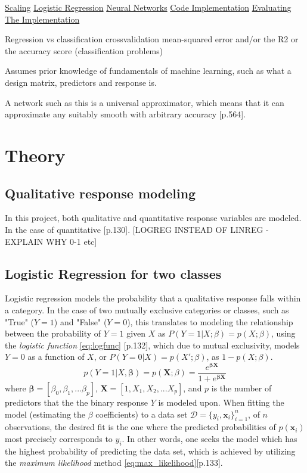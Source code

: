 \documentclass[%
oneside,                 %
final,                   %
10pt]{article}
\begin{document}
\hyperref[Section_M_Scaling]{Scaling}
\hyperref[Section_M_Logreg]{Logistic Regression}
\hyperref[Section_M_NN]{Neural Networks}
\hyperref[Section_M_Codeimpl]{Code Implementation}
\hyperref[Section_M_eval]{Evaluating The Implementation}

Regression vs classification
crossvalidation
mean-squared error and/or the R2
or the accuracy score (classification problems) 

Assumes prior knowledge of fundamentals of machine learning, such as what a design matrix, predictors and response is.

A network such as this is a universal approximator, which means that it can approximate any suitably smooth with arbitrary accuracy \citep{MLMurphy}[p.564].
\section{Theory} \label{Section_Theory}

\subsection{Qualitative response modeling}
In this project, both qualitative and quantitative response variables are modeled.  In the case of quantitative \citep{2017introstatlearn}[p.130]. [LOGREG INSTEAD OF LINREG  -EXPLAIN WHY 0-1 etc]


\subsection{Logistic Regression for two classes} \label{Section_M_Logreg}
Logistic regression models the probability that a qualitative response falls within a category. In the case of two mutually exclusive categories or classes, such as "True" ($Y=1$) and "False" ($Y=0$), this translates to modeling the relationship between the probability of $Y=1$ given $X$ as $P(Y=1|X;\beta)=p(X;\beta)$, using the \textit{logistic function} \eqref{eq:logfunc} \citep{2017introstatlearn}[p.132], which due to mutual exclusivity, models $Y=0$ as a function of $X$, or $P(Y=0|X)=p(X';\beta)$, as $1-p(X;\beta)$.
\begin{equation}
p(Y=1|X, \bm{\beta})= p(\bm{X};{\beta})=\frac{e^{\bm{\beta}\bm{X}}}{1+e^{\bm{\beta}\bm{X}}}
\label{eq:logfunc}
\end{equation}
where $\bm{\beta}=[\beta_0, \beta_1, ... \beta_p]$, $\bm{X}=[1,X_1, X_2, ... X_p]$, and $p$ is the number of predictors that the the binary response $Y$ is modeled upon. When fitting the model (estimating the $\beta$ coefficients) to a data set $\mathcal{D}=\{y_i,\bm{x}_i\}_{i=1}^n$, of $n$ observations, the desired fit is the one where the predicted probabilities of $p(\bm{x}_i)$  most precisely corresponds to $y_i$. In other words, one seeks the model which has the highest probability of predicting the data set, which is achieved by utilizing the \textit{maximum likelihood} method \eqref{eq:max_likelihood}\citep{2017introstatlearn}[p.133]. 
\end{document}
